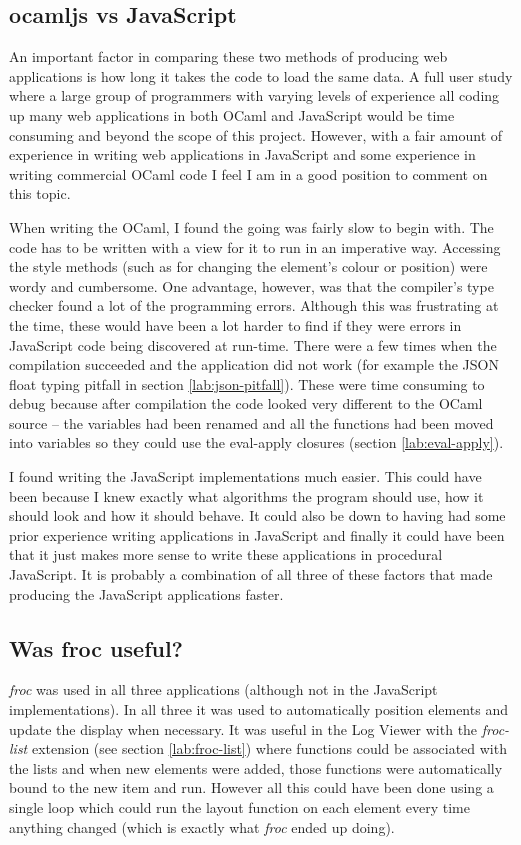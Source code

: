 \subsection{ocamljs vs JavaScript}
An important factor in comparing these two methods of producing web applications is how long it takes the code to load the same data. A full user study where a large group of programmers with varying levels of experience all coding up many web applications in both OCaml and JavaScript would be time consuming and beyond the scope of this project. However, with a fair amount of experience in writing web applications in JavaScript and some experience in writing commercial OCaml code I feel I am in a good position to comment on this topic.

When writing the OCaml, I found the going was fairly slow to begin with. The code has to be written with a view for it to run in an imperative way. Accessing the style methods (such as for changing the element's colour or position) were wordy and cumbersome. One advantage, however, was that the compiler's type checker found a lot of the programming errors. Although this was frustrating at the time, these would have been a lot harder to find if they were errors in JavaScript code being discovered at run-time. There were a few times when the compilation succeeded and the application did not work (for example the JSON float typing pitfall in section \ref{lab:json-pitfall}). These were time consuming to debug because after compilation the code looked very different to the OCaml source -- the variables had been renamed and all the functions had been moved into variables so they could use the eval-apply closures (section \ref{lab:eval-apply}).

I found writing the JavaScript implementations much easier. This could have been because I knew exactly what algorithms the program should use, how it should look and how it should behave. It could also be down to having had some prior experience writing applications in JavaScript and finally it could have been that it just makes more sense to write these applications in procedural JavaScript. It is probably a combination of all three of these factors that made producing the JavaScript applications faster.

\subsection{Was froc useful?}
\emph{froc} was used in all three applications (although not in the JavaScript implementations). In all three it was used to automatically position elements and update the display when necessary. It was useful in the Log Viewer with the \emph{froc-list} extension (see section \ref{lab:froc-list}) where functions could be associated with the lists and when new elements were added, those functions were automatically bound to the new item and run. However all this could have been done using a single loop which could run the layout function on each element every time anything changed (which is exactly what \emph{froc} ended up doing).


